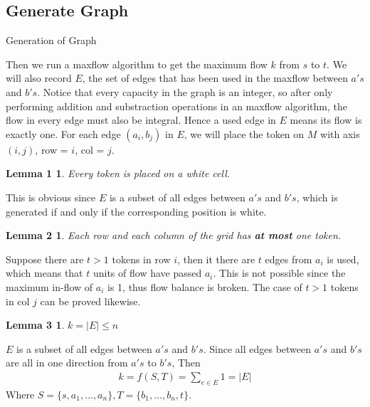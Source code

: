 \documentclass{report}
\begin{document}
    \subsection*{Generate Graph}
    \begin{algorithm}
        \caption{Generation of Graph}
        \begin{algorithmic}[1]
            \EndFor{}
                    \EndIf{}
                \EndFor{}
            \EndFor{}
        \end{algorithmic}
    \end{algorithm}
    Then we run a maxflow algorithm to get the maximum flow $k$ from $s$ to $t$. 
    We will also record $E$, the set of edges that has been used in the maxflow between 
    $a's$ and $b's$. Notice that every capacity in the graph is an integer, so after only 
    performing addition and substraction operations in an maxflow algorithm, the flow in every
    edge must also be integral. Hence a used edge in $E$ means its flow is exactly one. 
    For each edge $(a_i, b_j)$ in $E$, we will place the token on $M$ 
    with axis $(i, j)$, row = $i$, col = $j$. 
    \newtheorem*{l1}{Lemma 1}
    \begin{l1}
        Every token is placed on a white cell.
    \end{l1}
    This is obvious since $E$ is a subset of all edges between $a's$ and $b's$, which 
    is generated if and only if the corresponding position is white.
    \newtheorem*{l2}{Lemma 2}
    \begin{l2}
        Each row and each column of the grid has \textbf{at most} one token.
    \end{l2}
    Suppose there are $t>1$ tokens in row $i$, then it there are $t$ edges from
    $a_i$ is used, which means that $t$ units of flow have passed $a_i$. This is not 
    possible since the maximum in-flow of $a_i$ is 1, thus flow balance is broken.
    The case of $t>1$ tokens in col $j$ can be proved likewise. 
    \newtheorem*{l3}{Lemma 3}
    \begin{l3}
        $k = |E| \le n$
    \end{l3}
    $E$ is a subset of all edges between $a's$ and $b's$. Since all edges between $a's$ 
    and $b's$ are all in one direction from $a's$ to $b's$, Then 
    \begin{align*}
        k = f(S, T) = \sum_{e \in E} 1 = |E|
    \end{align*}
    Where $S = \{s, a_1, \ldots, a_n\}, T = \{b_1, \ldots, b_n, t\}$.
\end{document}
